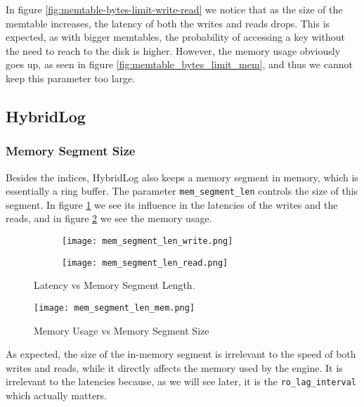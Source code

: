 In figure \ref{fig:memtable-bytes-limit-write-read} we notice that as the size of the memtable increases, the latency of both the writes and reads drops. This is expected, as with bigger memtables, the probability of accessing a key without the need to reach to the disk is higher. However, the memory usage obviously goes up, as seen in figure \ref{fig:memtable_bytes_limit_mem}, and thus we cannot keep this parameter too large.

\subsection{HybridLog}

\subsubsection{Memory Segment Size}

Besides the indices, HybridLog also keeps a memory segment in memory, which is essentially a ring buffer. The parameter \verb"mem_segment_len" controls the size of this segment. In figure \ref{fig:mem_segment_len_write_read} we see its influence in the latencies of the writes and the reads, and in figure \ref{fig:mem_segment_len_mem.png} we see the memory usage.

\begin{figure}[H]
    \begin{subfigure}{.5\textwidth}
        \centering
        \texttt{[image: mem\_segment\_len\_write.png]}
    \end{subfigure}
    \begin{subfigure}{.5\textwidth}
        \centering
        \texttt{[image: mem\_segment\_len\_read.png]}
    \end{subfigure}
    \caption{Latency vs Memory Segment Length.}
    \label{fig:mem_segment_len_write_read}
\end{figure}


\begin{figure}[H]
    \centering
    \texttt{[image: mem\_segment\_len\_mem.png]}
    \caption{Memory Usage vs Memory Segment Size}
    \label{fig:mem_segment_len_mem.png}
\end{figure}

As expected, the size of the in-memory segment is irrelevant to the speed of both writes and reads, while it directly affects the memory used by the engine. It is irrelevant to the latencies because, as we will see later, it is the \verb"ro_lag_interval" which actually matters.

